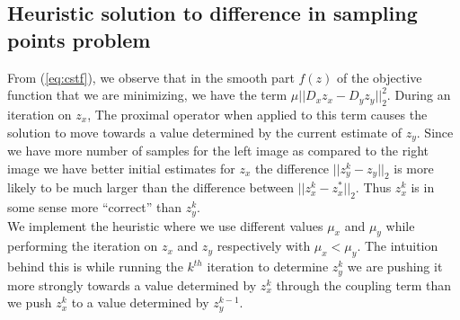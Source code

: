 \subsection{Heuristic solution to difference in sampling points problem}
From (\ref{eq:cstf}), we observe that in the smooth part $f(z)$ of the objective function that we are minimizing,
we have the term  $\mu ||D_x z_x - D_y z_y||_2^2$.  During an iteration on $z_x$, The proximal operator when applied to this term causes the solution to move towards a value determined by the current estimate of $z_y$. Since we have more number of samples for the left image as compared to the right image we have better initial estimates for $z_x$ the difference   $|| z_y^{k} - z_y ||_2$ is more likely to be much larger than the difference between $|| z_x^{k} - z_x^*||_2.$  Thus $z_x^k$ is in some sense more ``correct'' than $z_y^k$.\\
We implement the heuristic where we use different values $\mu_x$ and $\mu_y$ while performing the iteration on $z_x$ and $z_y$ respectively with $\mu_x < \mu_y$. The intuition behind this is while running the $k^{th}$ iteration to determine $z_y^{k}$ we are pushing it more strongly towards a value determined by $z_x^{k}$ through the coupling term than we push $z_x^{k}$ to a value determined by $z_y^{k-1}$.

